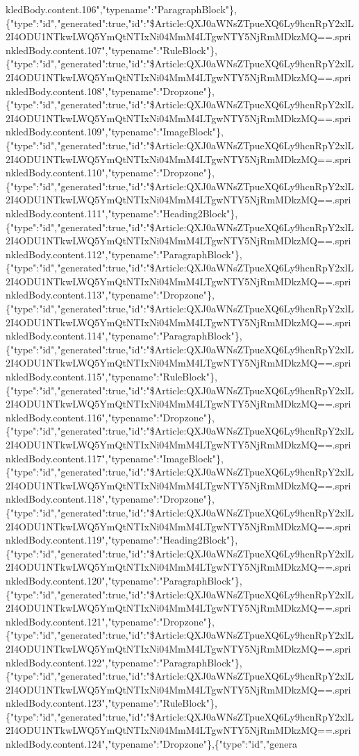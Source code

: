 kledBody.content.106","typename":"ParagraphBlock"\},\{"type":"id","generated":true,"id":"\$Article:QXJ0aWNsZTpueXQ6Ly9hcnRpY2xlL2I4ODU1NTkwLWQ5YmQtNTIxNi04MmM4LTgwNTY5NjRmMDkzMQ==.sprinkledBody.content.107","typename":"RuleBlock"\},\{"type":"id","generated":true,"id":"\$Article:QXJ0aWNsZTpueXQ6Ly9hcnRpY2xlL2I4ODU1NTkwLWQ5YmQtNTIxNi04MmM4LTgwNTY5NjRmMDkzMQ==.sprinkledBody.content.108","typename":"Dropzone"\},\{"type":"id","generated":true,"id":"\$Article:QXJ0aWNsZTpueXQ6Ly9hcnRpY2xlL2I4ODU1NTkwLWQ5YmQtNTIxNi04MmM4LTgwNTY5NjRmMDkzMQ==.sprinkledBody.content.109","typename":"ImageBlock"\},\{"type":"id","generated":true,"id":"\$Article:QXJ0aWNsZTpueXQ6Ly9hcnRpY2xlL2I4ODU1NTkwLWQ5YmQtNTIxNi04MmM4LTgwNTY5NjRmMDkzMQ==.sprinkledBody.content.110","typename":"Dropzone"\},\{"type":"id","generated":true,"id":"\$Article:QXJ0aWNsZTpueXQ6Ly9hcnRpY2xlL2I4ODU1NTkwLWQ5YmQtNTIxNi04MmM4LTgwNTY5NjRmMDkzMQ==.sprinkledBody.content.111","typename":"Heading2Block"\},\{"type":"id","generated":true,"id":"\$Article:QXJ0aWNsZTpueXQ6Ly9hcnRpY2xlL2I4ODU1NTkwLWQ5YmQtNTIxNi04MmM4LTgwNTY5NjRmMDkzMQ==.sprinkledBody.content.112","typename":"ParagraphBlock"\},\{"type":"id","generated":true,"id":"\$Article:QXJ0aWNsZTpueXQ6Ly9hcnRpY2xlL2I4ODU1NTkwLWQ5YmQtNTIxNi04MmM4LTgwNTY5NjRmMDkzMQ==.sprinkledBody.content.113","typename":"Dropzone"\},\{"type":"id","generated":true,"id":"\$Article:QXJ0aWNsZTpueXQ6Ly9hcnRpY2xlL2I4ODU1NTkwLWQ5YmQtNTIxNi04MmM4LTgwNTY5NjRmMDkzMQ==.sprinkledBody.content.114","typename":"ParagraphBlock"\},\{"type":"id","generated":true,"id":"\$Article:QXJ0aWNsZTpueXQ6Ly9hcnRpY2xlL2I4ODU1NTkwLWQ5YmQtNTIxNi04MmM4LTgwNTY5NjRmMDkzMQ==.sprinkledBody.content.115","typename":"RuleBlock"\},\{"type":"id","generated":true,"id":"\$Article:QXJ0aWNsZTpueXQ6Ly9hcnRpY2xlL2I4ODU1NTkwLWQ5YmQtNTIxNi04MmM4LTgwNTY5NjRmMDkzMQ==.sprinkledBody.content.116","typename":"Dropzone"\},\{"type":"id","generated":true,"id":"\$Article:QXJ0aWNsZTpueXQ6Ly9hcnRpY2xlL2I4ODU1NTkwLWQ5YmQtNTIxNi04MmM4LTgwNTY5NjRmMDkzMQ==.sprinkledBody.content.117","typename":"ImageBlock"\},\{"type":"id","generated":true,"id":"\$Article:QXJ0aWNsZTpueXQ6Ly9hcnRpY2xlL2I4ODU1NTkwLWQ5YmQtNTIxNi04MmM4LTgwNTY5NjRmMDkzMQ==.sprinkledBody.content.118","typename":"Dropzone"\},\{"type":"id","generated":true,"id":"\$Article:QXJ0aWNsZTpueXQ6Ly9hcnRpY2xlL2I4ODU1NTkwLWQ5YmQtNTIxNi04MmM4LTgwNTY5NjRmMDkzMQ==.sprinkledBody.content.119","typename":"Heading2Block"\},\{"type":"id","generated":true,"id":"\$Article:QXJ0aWNsZTpueXQ6Ly9hcnRpY2xlL2I4ODU1NTkwLWQ5YmQtNTIxNi04MmM4LTgwNTY5NjRmMDkzMQ==.sprinkledBody.content.120","typename":"ParagraphBlock"\},\{"type":"id","generated":true,"id":"\$Article:QXJ0aWNsZTpueXQ6Ly9hcnRpY2xlL2I4ODU1NTkwLWQ5YmQtNTIxNi04MmM4LTgwNTY5NjRmMDkzMQ==.sprinkledBody.content.121","typename":"Dropzone"\},\{"type":"id","generated":true,"id":"\$Article:QXJ0aWNsZTpueXQ6Ly9hcnRpY2xlL2I4ODU1NTkwLWQ5YmQtNTIxNi04MmM4LTgwNTY5NjRmMDkzMQ==.sprinkledBody.content.122","typename":"ParagraphBlock"\},\{"type":"id","generated":true,"id":"\$Article:QXJ0aWNsZTpueXQ6Ly9hcnRpY2xlL2I4ODU1NTkwLWQ5YmQtNTIxNi04MmM4LTgwNTY5NjRmMDkzMQ==.sprinkledBody.content.123","typename":"RuleBlock"\},\{"type":"id","generated":true,"id":"\$Article:QXJ0aWNsZTpueXQ6Ly9hcnRpY2xlL2I4ODU1NTkwLWQ5YmQtNTIxNi04MmM4LTgwNTY5NjRmMDkzMQ==.sprinkledBody.content.124","typename":"Dropzone"\},\{"type":"id","genera